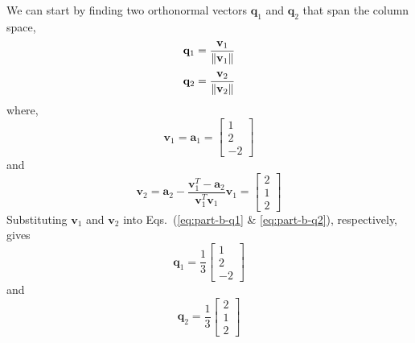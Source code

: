\begin{mdframed}[style=MyFrame]
    We can start by finding two orthonormal vectors $\mathbf{q}_{1}$ and
    $\mathbf{q}_{2}$ that span the column space,
    \begin{equation}
        \mathbf{q}_{1} =  \frac{\mathbf{v}_{1}}{\norm{\mathbf{v}_{1}}}
        \label{eq:part-b-q1}
    \end{equation}
    \begin{equation}
        \mathbf{q}_{2} =  \frac{\mathbf{v}_{2}}{\norm{\mathbf{v}_{2}}}
        \label{eq:part-b-q2}
    \end{equation}
    where,
    \begin{equation}
        \mathbf{v}_{1} = \mathbf{a}_{1} =  
        \begin{bmatrix}
            1   \\
            2   \\
            -2
        \end{bmatrix}
    \end{equation}
    and 
    \begin{equation}
        \mathbf{v}_{2} = 
        \mathbf{a}_{2} 
        - \frac{\mathbf{v}_{1}^{T} - \mathbf{a}_{2}}
            {\mathbf{v}_{1}^{T}\mathbf{v}_{1}}\mathbf{v}_{1}=  
        \begin{bmatrix}
            2   \\
            1   \\
            2
        \end{bmatrix}
    \end{equation}
    Substituting $\mathbf{v}_{1}$ and $\mathbf{v}_{2}$ into
    Eqs.~(\ref{eq:part-b-q1} \& \ref{eq:part-b-q2}), respectively, gives
    \begin{equation}
        \mathbf{q}_{1} = 
        \frac{1}{3}
        \begin{bmatrix}
            1       \\
            2       \\
            -2
        \end{bmatrix}
    \end{equation}
    and 
    \begin{equation}
        \mathbf{q}_{2} =
        \frac{1}{3}
        \begin{bmatrix}
            2       \\
            1       \\
            2
        \end{bmatrix}
    \end{equation}

\end{mdframed}
